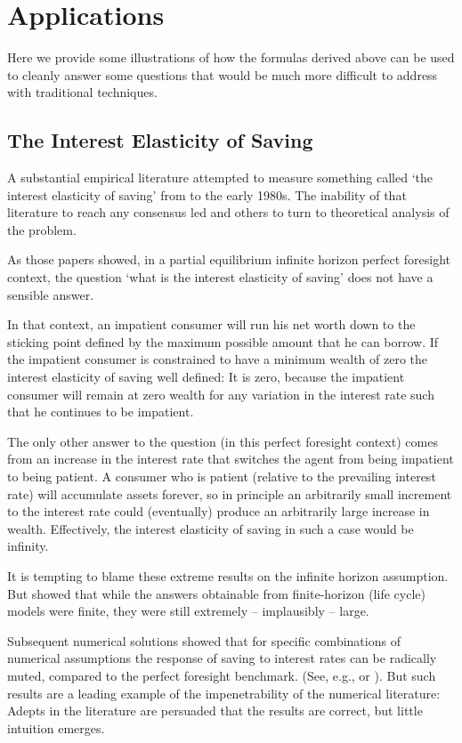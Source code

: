 \documentclass[titlepage,abstract]{\econtex}\newcommand{\texname}{ctDiscrete}
\begin{document}
\section{Applications}

Here we provide some illustrations of how the formulas derived above can be used 
to cleanly answer some questions that would be much more difficult to address 
with traditional techniques.

\subsection{The Interest Elasticity of Saving}

A substantial empirical literature attempted to measure something called `the interest
elasticity of saving' from \cite{wrightInterestElasticity} to
the early 1980s.  The inability of that literature to reach any
consensus led \cite{summersCapTax} and others to turn to theoretical
analysis of the problem.

As those papers showed, in a partial equilibrium infinite horizon
perfect foresight context, the question `what is the interest elasticity of saving' does not have a sensible answer.

In that context, an impatient consumer will run his net worth down to
the sticking point defined by the maximum possible amount that he can
borrow.  If the impatient consumer is constrained to have a
minimum wealth of zero the interest elasticity of saving well
defined: It is zero, because the impatient consumer will remain at
zero wealth for any variation in the interest rate such that he
continues to be impatient.

The only other answer to the question (in this perfect
foresight context) comes from an increase in the interest rate that
switches the agent from being impatient to being patient.  A consumer
who is patient (relative to the prevailing interest rate) will
accumulate assets forever, so in principle an arbitrarily small
increment to the interest rate could (eventually) produce an
arbitrarily large increase in wealth.  Effectively, the interest
elasticity of saving in such a case would be infinity.

It is tempting to blame these extreme results on the infinite horizon
assumption.  But \cite{summersCapTax} showed that while the answers
obtainable from finite-horizon (life cycle) models were finite, 
they were still extremely -- implausibly -- large.  

Subsequent numerical solutions showed that for specific combinations
of numerical assumptions the response of saving to interest rates can
be radically muted, compared to the perfect foresight benchmark.
(See, e.g., \cite{carroll:bslcpih} or
\cite{cagettiInterestElasticity}).  But such results are a leading
example of the impenetrability of the numerical literature: Adepts in
the literature are persuaded that the results are correct, but little
intuition emerges.  
\end{document}
